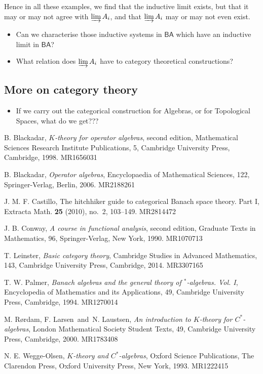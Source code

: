 \documentclass[a4paper,11pt]{article}
\newcommand{\indlim}{\varinjlim}
\newcommand{\ba}{\textsf{BA}}
\theoremstyle{definition}
\begin{document}
Hence in all these examples, we find that the inductive limit exists, but that it may or may not
agree with $\indlim A_i$, and that $\indlim A_i$ may or may not even exist.
\begin{itemize}
\item Can we characterise those inductive systems in $\ba$ which have an inductive limit in $\ba$?
\item What relation does $\indlim A_i$ have to category theoretical constructions?
\end{itemize}



\subsection{More on category theory}

\begin{itemize}
\item If we carry out the categorical construction for Algebras, or for Topological Spaces, what
do we get???
\end{itemize}




\begin{thebibliography}{99}

 B. Blackadar, {\it $K$-theory for operator algebras}, second edition, Mathematical Sciences Research Institute Publications, 5, Cambridge University Press, Cambridge, 1998. MR1656031

 B. Blackadar, {\it Operator algebras}, Encyclopaedia of Mathematical Sciences, 122, Springer-Verlag, Berlin, 2006. MR2188261

 J. M. F. Castillo, The hitchhiker guide to categorical Banach space theory. Part I, Extracta Math. {\bf 25} (2010), no.~2, 103--149. MR2814472

 J. B. Conway, {\it A course in functional analysis}, second edition, Graduate Texts in Mathematics, 96, Springer-Verlag, New York, 1990. MR1070713

 T. Leinster, {\it Basic category theory}, Cambridge Studies in Advanced Mathematics, 143, Cambridge University Press, Cambridge, 2014. MR3307165

 T. W. Palmer, {\it Banach algebras and the general theory of $^*$-algebras. Vol. I}, Encyclopedia of Mathematics and its Applications, 49, Cambridge University Press, Cambridge, 1994. MR1270014

 M. R\o rdam, F. Larsen\ and\ N. Laustsen, {\it An introduction to $K$-theory for $C^*$-algebras}, London Mathematical Society Student Texts, 49, Cambridge University Press, Cambridge, 2000. MR1783408

 N. E. Wegge-Olsen, {\it $K$-theory and $C^*$-algebras}, Oxford Science Publications, The Clarendon Press, Oxford University Press, New York, 1993. MR1222415

\end{thebibliography}
\end{document}
